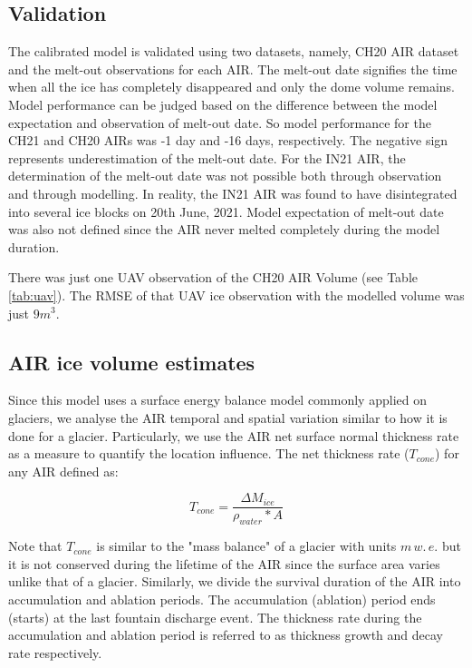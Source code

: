 \documentclass[utf8]{frontiersSCNS} %
\begin{document}
\subsection{Validation}

The calibrated model is validated using two datasets, namely, CH20 AIR dataset and the melt-out observations for
each AIR. The melt-out date signifies the time when all the ice has completely disappeared and only the dome volume
remains. Model performance can be judged based on the difference between the model expectation and observation of
melt-out date.  So model performance for the CH21 and CH20 AIRs was -1 day and -16 days, respectively. The negative
sign represents underestimation of the melt-out date. For the IN21 AIR, the determination of the melt-out date was
not possible both through observation and through modelling.  In reality, the IN21 AIR was found to have
disintegrated into several ice blocks on 20th June, 2021.  Model expectation of melt-out date was also not defined
since the AIR never melted completely during the model duration.

There was just one UAV observation of the CH20 AIR Volume (see Table \ref{tab:uav}).  The RMSE of that UAV ice
observation with the modelled volume was just $9 m^3$.

\subsection{AIR ice volume estimates}

Since this model uses a surface energy balance model commonly applied on glaciers, we analyse the AIR temporal
and spatial variation similar to how it is done for a glacier. Particularly, we use the AIR net surface normal
thickness rate as a measure to quantify the location influence. The net thickness rate ($T_{cone}$) for any
AIR defined as:

\begin{equation} T_{cone}=\frac{\Delta M_{ice}}{\rho_{water}* A} \end{equation}

Note that $T_{cone}$ is similar to the "mass balance" of a glacier with units $m \, w.\, e.$ but it is not
conserved during the lifetime of the AIR since the surface area varies unlike that of a glacier.  Similarly, we
divide the survival duration of the AIR into accumulation and ablation periods. The accumulation (ablation)
period ends (starts) at the last fountain discharge event. The thickness rate during the accumulation and
ablation period is referred to as thickness growth and decay rate respectively.
\end{document}
